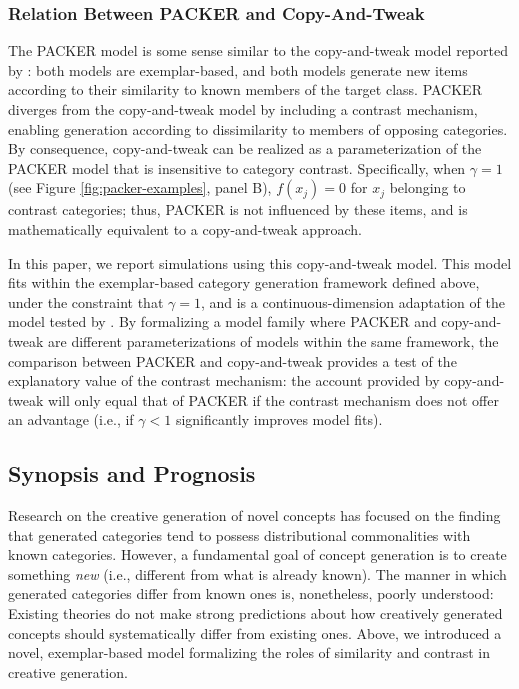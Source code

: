 \documentclass[12pt]{article}
\begin{document}
\begin{flushleft}
\subsubsection{Relation Between PACKER and Copy-And-Tweak}
\label{section:copytweak-packer}
The PACKER model is some sense similar to the copy-and-tweak model reported by \cite{jern2013probabilistic}: both models are exemplar-based, and both models generate new items according to their similarity to known members of the target class. PACKER diverges from the copy-and-tweak model by including a contrast mechanism, enabling generation according to dissimilarity to members of opposing categories. By consequence, copy-and-tweak can be realized as a parameterization of the PACKER model that is insensitive to category contrast. Specifically, when $\gamma = 1$ (see Figure \ref{fig:packer-examples}, panel B), $f(x_j) = 0$ for $x_j$ belonging to contrast categories; thus, PACKER is not influenced by these items, and is mathematically equivalent to a copy-and-tweak approach. 

In this paper, we report simulations using this copy-and-tweak model. This model fits within the exemplar-based category generation framework defined above, under the constraint that $\gamma = 1$, and is a continuous-dimension adaptation of the model tested by \cite{jern2013probabilistic}. By formalizing a model family where PACKER and copy-and-tweak are different parameterizations of models within the same framework, the comparison between PACKER and copy-and-tweak provides a test of the explanatory value of the contrast mechanism: the account provided by copy-and-tweak will only equal that of PACKER if the contrast mechanism does not offer an advantage (i.e., if $\gamma < 1$ significantly improves model fits).


\subsection{Synopsis and Prognosis}

Research on the creative generation of novel concepts has focused on the finding that generated categories tend to possess distributional commonalities with known categories. However, a fundamental goal of concept generation is to create something \textit{new} (i.e., different from what is already known). The manner in which generated categories differ from known ones is, nonetheless, poorly understood: Existing theories do not make strong predictions about how creatively generated concepts should systematically differ from existing ones. Above, we introduced a novel, exemplar-based model formalizing the roles of similarity and contrast in creative generation.


\end{flushleft}
\end{document}
